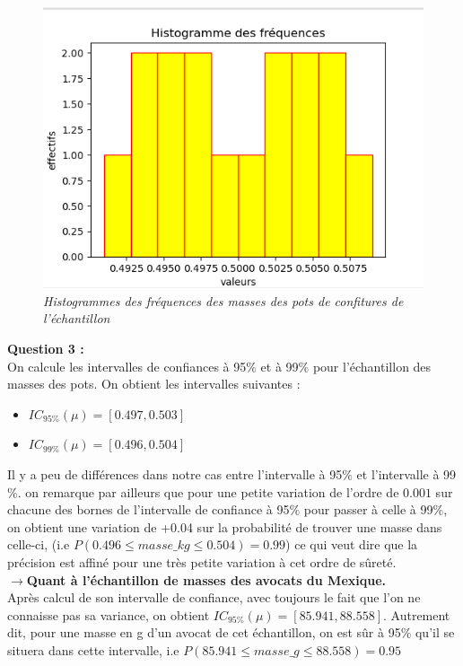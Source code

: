 \documentclass{article}      %
\begin{document}
\begin{figure}[H]
    \centering
     \scalebox{.75}
     {
     	\includegraphics[scale=1]{img/histogr_frequ_masses_pots.png} 
     }
     \\
     \textit{Histogrammes des fréquences des masses des pots de confitures de l'échantillon}
\end{figure}

\textbf{Question 3 :} \\ On calcule les intervalles de confiances à 95$\%$ et à 99$\%$ pour l'échantillon des masses des pots. On obtient les intervalles suivantes : \\

\begin{center}
	\begin{itemize}
		\item $IC_{95\%}(\mu) = [0.497, 0.503]$
		\item $IC_{99\%}(\mu) = [0.496, 0.504]$
	\end{itemize}
\end{center} 

Il y a peu de différences dans notre cas entre l'intervalle à 95$\%$ et l'intervalle à 99$\%$. on remarque par ailleurs que pour une petite variation de l'ordre de $0.001$ sur chacune des bornes de l'intervalle de confiance à 95$\%$ pour passer à celle à 99$\%$, on obtient une variation de +0.04 sur la probabilité de trouver une masse dans celle-ci, (i.e $P(0.496 \le masse\_kg \le 0.504) = 0.99$) ce qui veut dire que la précision est affiné pour une très petite variation à cet ordre de sûreté.\\
\newline
$\rightarrow$\textbf{Quant à l'échantillon de masses des avocats du Mexique.}\\
Après calcul de son intervalle de confiance, avec toujours le fait que l'on ne connaisse pas sa variance, on obtient $IC_{95\%}(\mu) = [85.941, 88.558]$. Autrement dit, pour une masse en g d'un avocat de cet échantillon, on est sûr à 95$\%$ qu'il se situera dans cette intervalle, i.e $P(85.941 \le masse\_g \le 88.558) = 0.95$
\end{document}

